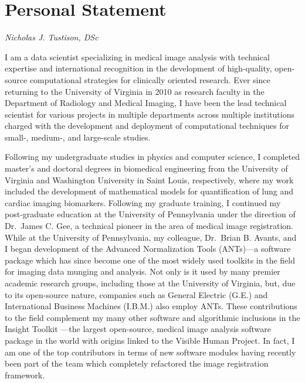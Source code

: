 \documentclass[12pt,]{article}
\title{}
\author{}
\date{}
\begin{document}
\maketitle


\section{Personal Statement}\label{personal-statement}

\emph{Nicholas J. Tustison, DSc}

I am a data scientist specializing in medical image analysis with
technical expertise and international recognition in the development of
high-quality, open-source computational strategies for clinically
oriented research. Ever since returning to the University of Virginia in
2010 as research faculty in the Department of Radiology and Medical
Imaging, I have been the lead technical scientist for various projects
in multiple departments across multiple institutions charged with the
development and deployment of computational techniques for small-,
medium-, and large-scale studies.

Following my undergraduate studies in physics and computer science, I
completed master's and doctoral degrees in biomedical engineering from
the University of Virginia and Washington University in Saint Louis,
respectively, where my work included the development of mathematical
models for quantification of lung and cardiac imaging biomarkers.
Following my graduate training, I continued my post-graduate education
at the University of Pennsylvania under the direction of Dr.~James C.
Gee, a technical pioneer in the area of medical image registration.
While at the University of Pennsylvania, my colleague, Dr.~Brian B.
Avants, and I began development of the Advanced Normalization Tools
(ANTs)---a software package which has since become one of the most
widely used toolkits in the field for imaging data munging and analysis.
Not only is it used by many premier academic research groups, including
those at the University of Virginia, but, due to its open-source nature,
companies such as General Electric (G.E.) and International Business
Machines (I.B.M.) also employ ANTs. These contributions to the field
complement my many other software and algorithmic inclusions in the
Insight Toolkit ---the largest open-source, medical image analysis
software package in the world with origins linked to the Visible Human
Project. In fact, I am one of the top contributors in terms of new
software modules having recently been part of the team which completely
refactored the image registration framework.
\end{document}
